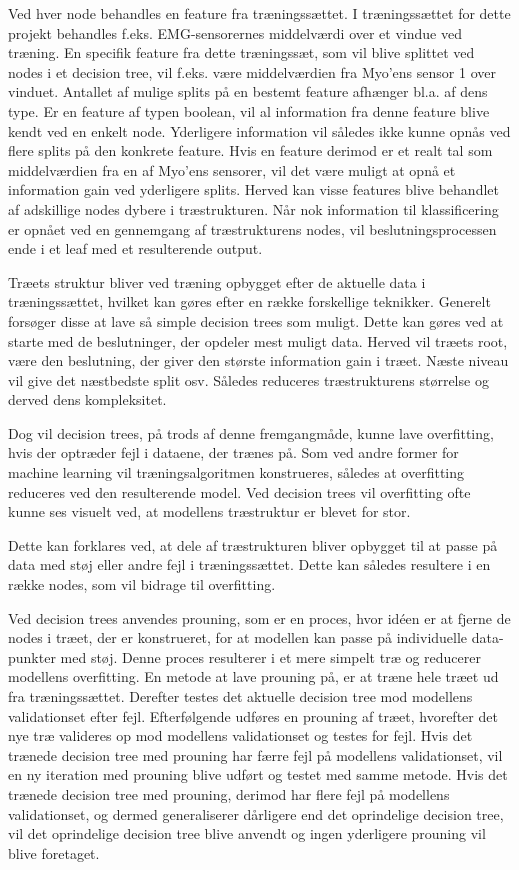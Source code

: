 Ved hver node behandles en feature fra træningssættet. I træningssættet for dette projekt behandles f.eks. EMG-sensorernes middelværdi over et vindue ved træning. En specifik feature fra dette træningssæt, som vil blive splittet ved nodes i et decision tree, vil f.eks. være middelværdien fra Myo’ens sensor 1 over vinduet. 
Antallet af mulige splits på en bestemt feature afhænger bl.a. af dens type. Er en feature af typen boolean, vil al information fra denne feature blive kendt ved en enkelt node. Yderligere information vil således ikke kunne opnås ved flere splits på den konkrete feature. Hvis en feature derimod er et realt tal som middelværdien fra en af Myo’ens sensorer, vil det være muligt at opnå et information gain ved yderligere splits. Herved kan visse features blive behandlet af adskillige nodes dybere i træstrukturen.
Når nok information til klassificering er opnået ved en gennemgang af træstrukturens nodes, vil beslutningsprocessen ende i et leaf med et resulterende output. 

Træets struktur bliver ved træning opbygget efter de aktuelle data i træningssættet, hvilket kan gøres efter en række forskellige teknikker. Generelt forsøger disse at lave så simple decision trees som muligt. Dette kan gøres ved at starte med de beslutninger, der opdeler mest muligt data. Herved vil træets root, være den beslutning, der giver den største information gain i træet. Næste niveau vil give det næstbedste split osv. Således reduceres træstrukturens størrelse og derved dens kompleksitet. 

Dog vil decision trees, på trods af denne fremgangmåde, kunne lave overfitting, hvis der optræder fejl i dataene, der trænes på. Som ved andre former for machine learning vil træningsalgoritmen konstrueres, således at overfitting reduceres ved den resulterende model. Ved decision trees vil overfitting ofte kunne ses visuelt ved, at modellens træstruktur er blevet for stor. 

Dette kan forklares ved, at dele af træstrukturen bliver opbygget til at passe på data med støj eller andre fejl i træningssættet. Dette kan således resultere i en række nodes, som vil bidrage til overfitting.

Ved decision trees anvendes prouning, som er en proces, hvor idéen er at fjerne de nodes i træet, der er konstrueret, for at modellen kan passe på individuelle data-punkter med støj. Denne proces resulterer i et mere simpelt træ og reducerer modellens overfitting. En metode at lave prouning på, er at træne hele træet ud fra træningssættet. Derefter testes det aktuelle decision tree mod modellens validationset efter fejl. Efterfølgende udføres en prouning af træet, hvorefter det nye træ valideres op mod modellens validationset og testes for fejl. Hvis det trænede decision tree med prouning har færre fejl på modellens validationset, vil en ny iteration med prouning blive udført og testet med samme metode. Hvis det trænede decision tree med prouning, derimod har flere fejl på modellens validationset, og dermed generaliserer dårligere end det oprindelige decision tree, vil det oprindelige decision tree blive anvendt og ingen yderligere prouning vil blive foretaget. 

